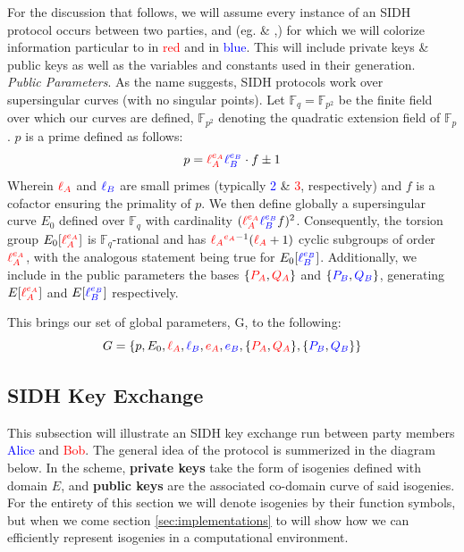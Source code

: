 For the discussion that follows, we will assume every instance of an SIDH protocol occurs between two parties, \ba and \rb (eg. \alice \& \bob,) for which we will colorize information particular to \ba in \textcolor{red}{red} and \rb in \textcolor{blue}{blue}. This will include private keys \& public keys as well as the variables and constants used in their generation.\\

\noindent
\emph{Public Parameters}. As the name suggests, SIDH protocols work over supersingular curves (with no singular points). Let $\mathbb{F}_q = \mathbb{F}_{p^2}$ be the finite field over which our curves are defined, $\mathbb{F}_{p^2}$ denoting the quadratic extension field of $\mathbb{F}_{p}$.  $p$ is a prime defined as follows:
$$
p = \textcolor{red}{\ell_{A}^{e_A}} \textcolor{blue}{\ell_{B}^{e_B}} \cdot f \pm 1
$$
Wherein $\textcolor{red}{\ell_{A}}$ and $\textcolor{blue}{\ell_{B}}$ are small primes (typically \textcolor{blue}{2} \& \textcolor{red}{3}, respectively) and $f$ is a cofactor ensuring the primality of $p$. We then define globally a supersingular curve $E_0$ defined over $\mathbb{F}_q$ with cardinality $(\textcolor{red}{\ell_{A}^{e_A}} \textcolor{blue}{\ell_{B}^{e_B}} f)^2$. Consequently, the torsion group $E_0[\textcolor{red}{\ell_{A}^{e_A}}]$ is $\mathbb{F}_q$-rational and has $\textcolor{red}{\ell_{A}}^{\textcolor{red}{e_A} - 1} (\textcolor{red}{\ell_{A}} + 1)$ cyclic subgroups of order $\textcolor{red}{\ell_{A}^{e_A}}$, with the analogous statement being true for $E_0[\textcolor{blue}{\ell_{B}^{e_B}}]$. Additionally, we include in the public parameters the bases $\{\textcolor{red}{P_A},\textcolor{red}{Q_A}\}$ and $\{\textcolor{blue}{P_B},\textcolor{blue}{Q_B}\}$, generating $E[\textcolor{red}{\ell_{A}^{e_A}}]$ and $E[\textcolor{blue}{\ell_{B}^{e_B}}]$ respectively. 

This brings our set of global parameters, G, to the following:\\
$$
G = \{p,E_0,\textcolor{red}{\ell_{A}},\textcolor{blue}{\ell_{B}},\textcolor{red}{e_A},\textcolor{blue}{e_B},\{\textcolor{red}{P_A},\textcolor{red}{Q_A}\},\{\textcolor{blue}{P_B},\textcolor{blue}{Q_B}\}\}
$$



\subsection{SIDH Key Exchange}

This subsection will illustrate an SIDH key exchange run between party members \textcolor{blue}{Alice} and \textcolor{red}{Bob}. The general idea of the protocol is summerized in the diagram below. In the scheme, \textbf{private keys} take the form of isogenies defined with domain $E$, and \textbf{public keys} are the associated co-domain curve of said isogenies.\cite{djp} For the entirety of this section we will denote isogenies by their function symbols, but when we come section \ref{sec:implementations} to  will show how we can efficiently represent isogenies in a computational environment.

